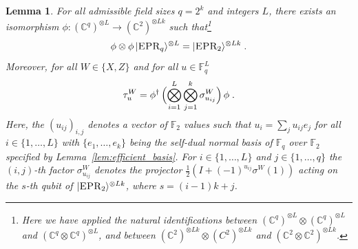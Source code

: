 \documentclass[11pt]{article}
\newtheorem{lemma}[theorem]{Lemma}
\theoremstyle{definition}
\newcommand{\ket}[1]{|#1\rangle}
\newcommand{\Id}{\ensuremath{I}}
\newcommand{\C}{\ensuremath{\mathbb{C}}}
\newcommand{\F}{\ensuremath{\mathbb{F}}}
\newcommand{\ot}{\otimes}
\newcommand{\labelstyle}[1]{\ensuremath{\textsc{#1}}\xspace}
\newcommand{\EPR}{\labelstyle{EPR}}
\begin{document}
\begin{lemma}
  \label{lem:pauli-binary}
  For all admissible field sizes $q = 2^k$ and integers $L$, there exists
  an isomorphism $\phi: (\C^q)^{\otimes L} \to (\C^2)^{\otimes L k}$
  such that\footnote{ Here we have applied the natural identifications between
  $(\C^q)^{\ot L} \ot (\C^q)^{\ot L}$ and $(\C^q \ot \C^q)^{\ot L}$,
  and between $(\C^2)^{\ot L k} \ot (C^2)^{\ot Lk}$ and $(\C^2 \ot
  \C^2)^{\ot Lk}$.}
\begin{equation}
    \label{eq:epr-q-to-epr-2}
    \phi \otimes \phi \, \ket{\EPR_q}^{\otimes L} =
    \ket{\EPR_2}^{\otimes L k}\;.
  \end{equation}
  Moreover, for all $W \in \{X,Z\}$ and for all $u \in \F_q^L$
	\begin{equation}
	\label{eq:pauli-q-to-pauli-2}
  	\tau^W_u = \phi^\dagger\, \Bigl (\bigotimes_{i=1}^L
    \bigotimes_{j=1}^{k} \sigma^{W}_{u_{ij}} \Bigr) \, \phi\;.
	\end{equation}
	Here, the $(u_{ij})_{i,j}$ denotes a vector of $\F_2$ values such that $u_i =
  \sum_j u_{ij} e_j$ for all $i \in \{1,\ldots,L\}$ with
  $\{e_1,\ldots,e_{k}\}$ being the self-dual normal basis of $\F_q$ over $\F_2$
  specified by Lemma~\ref{lem:efficient_basis}.
  For $i\in\{1,\ldots,L\}$ and $j\in\{1,\ldots,q\}$ the $(i,j)$-th factor
  $\sigma^{W}_{u_{ij}}$ denotes the projector $\frac{1}{2} \left ( \Id +
    (-1)^{u_{ij}} \sigma^W(1) \right)$ acting on the $s$-th qubit of
  $\ket{\EPR_2}^{\otimes L k}$, where $s = (i-1) k + j$.
\end{lemma}
\end{document}
